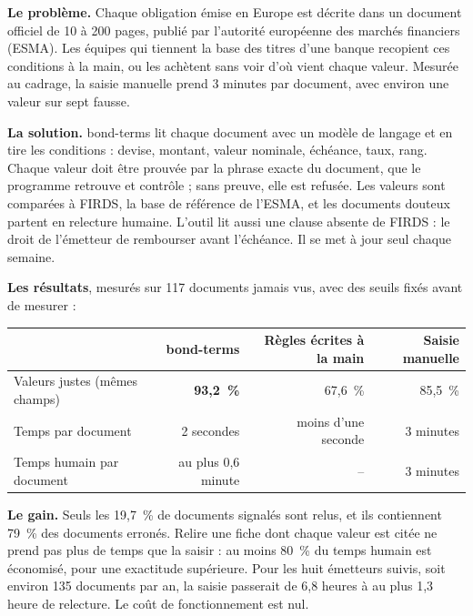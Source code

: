 \documentclass[11pt,a4paper]{article}
\begin{document}
\thispagestyle{empty}
\vspace{2pt}
\vspace{10pt}

\textbf{Le problème.} Chaque obligation émise en Europe est décrite dans un document officiel de 10 à 200 pages, publié par l'autorité européenne des marchés financiers (ESMA). Les équipes qui tiennent la base des titres d'une banque recopient ces conditions à la main, ou les achètent sans voir d'où vient chaque valeur. Mesurée au cadrage, la saisie manuelle prend 3 minutes par document, avec environ une valeur sur sept fausse.

\textbf{La solution.} bond-terms lit chaque document avec un modèle de langage et en tire les conditions : devise, montant, valeur nominale, échéance, taux, rang. Chaque valeur doit être prouvée par la phrase exacte du document, que le programme retrouve et contrôle ; sans preuve, elle est refusée. Les valeurs sont comparées à FIRDS, la base de référence de l'ESMA, et les documents douteux partent en relecture humaine. L'outil lit aussi une clause absente de FIRDS : le droit de l'émetteur de rembourser avant l'échéance. Il se met à jour seul chaque semaine.

\textbf{Les résultats}, mesurés sur 117 documents jamais vus, avec des seuils fixés avant de mesurer :

\begin{center}
\small
\begin{tabular}{lrrr}
\toprule
& \textbf{bond-terms} & \textbf{Règles écrites à la main} & \textbf{Saisie manuelle} \\
\midrule
Valeurs justes (mêmes champs) & \textbf{93,2~\%} & 67,6~\% & 85,5~\% \\
Temps par document & 2 secondes & moins d'une seconde & 3 minutes \\
Temps humain par document & au plus 0,6 minute & -- & 3 minutes \\
\bottomrule
\end{tabular}
\end{center}

\textbf{Le gain.} Seuls les 19,7~\% de documents signalés sont relus, et ils contiennent 79~\% des documents erronés. Relire une fiche dont chaque valeur est citée ne prend pas plus de temps que la saisir : au moins 80~\% du temps humain est économisé, pour une exactitude supérieure. Pour les huit émetteurs suivis, soit environ 135 documents par an, la saisie passerait de 6,8 heures à au plus 1,3 heure de relecture. Le coût de fonctionnement est nul.
\end{document}

